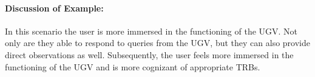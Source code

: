 \paragraph{\textbf{Discussion of Example:}} In this scenario the user is more immersed in the functioning of the UGV. Not only are they able to respond to queries from the UGV, but they can also provide direct observations as well. Subsequently, the user feels more immersed in the functioning of the UGV and is more cognizant of appropriate TRBs.
